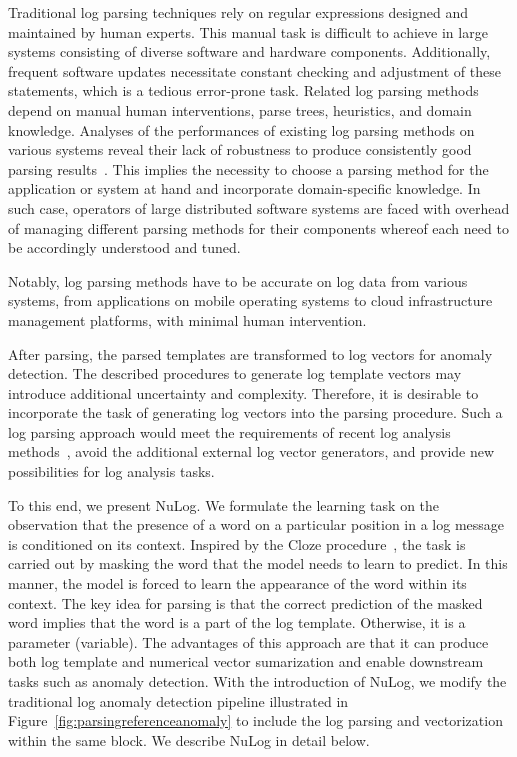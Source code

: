 Traditional log parsing techniques rely on regular expressions designed and maintained by human experts. This manual task is difficult to achieve in large systems consisting of diverse software and hardware components. Additionally, frequent software updates necessitate constant checking and adjustment of these statements, which is a tedious error-prone task. Related log parsing methods~\cite{he2017drain, du2016spell,hamooni2016logmine,zhu2017deep,imweber2015} depend on manual human interventions, parse trees, heuristics, and domain knowledge. Analyses of the performances of existing log parsing methods on various systems reveal their lack of robustness to produce consistently good parsing results~\cite{zhu2019tools}. 
This implies the necessity to choose a parsing method for the application or system at hand and incorporate domain-specific knowledge. In such case, operators of large distributed software systems are faced with overhead of managing different parsing methods for their components whereof each need to be accordingly understood and tuned. 

Notably, log parsing methods have to be accurate on log data from various systems, from applications on mobile operating systems to cloud infrastructure management platforms, with minimal human intervention.

After parsing, the parsed templates are transformed to log vectors for anomaly detection. The described procedures to generate log template vectors may introduce additional uncertainty and complexity. Therefore, it is desirable to incorporate the task of generating log vectors into the parsing procedure. Such a log parsing approach would meet the requirements of recent log analysis methods~\cite{meng2019loganomaly,huang2020hitanomaly,zhang2019robust}, avoid the additional external log vector generators, and provide new possibilities for log analysis tasks.

To this end, we present NuLog. We formulate the learning task on the observation that the presence of a word on a particular position in a log message is conditioned on its context. Inspired by the Cloze procedure~\cite{taylor1953cloze}, the task is carried out by masking the word that the model needs to learn to predict. In this manner, the model is forced to learn the appearance of the word within its context. The key idea for parsing is that the correct prediction of the masked word implies that the word is a part of the log template. Otherwise, it is a parameter (variable). The advantages of this approach are that it can produce both log template and numerical vector sumarization and enable downstream tasks such as anomaly detection. With the introduction of NuLog, we modify the traditional log anomaly detection pipeline illustrated in Figure~\ref{fig:parsingreferenceanomaly} to include the log parsing and vectorization within the same block. We describe NuLog in detail below.

